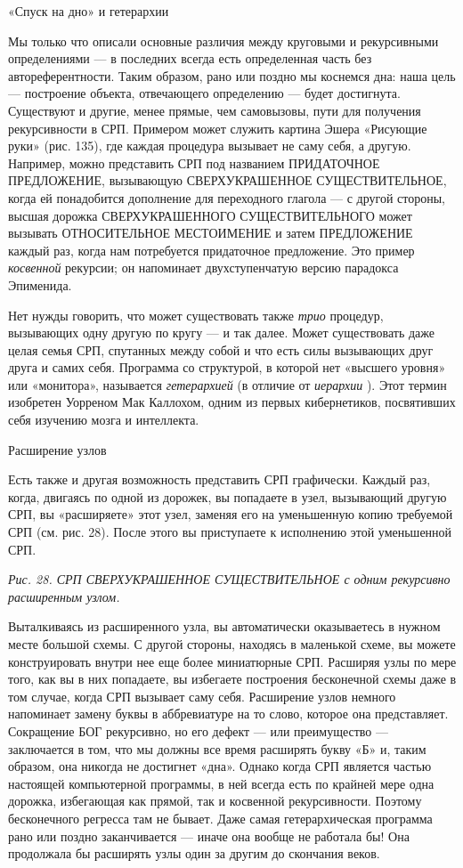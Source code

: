 «Спуск на дно» и гетерархии

Мы только что описали основные различия между круговыми и рекурсивными определениями --- в последних всегда есть определенная часть без автореферентности. Таким образом, рано или поздно мы коснемся дна: наша цель --- построение объекта, отвечающего определению --- будет достигнута. Существуют и другие, менее прямые, чем самовызовы, пути для получения рекурсивности в СРП. Примером может служить картина Эшера «Рисующие руки» (рис. 135), где каждая процедура вызывает не саму себя, а другую. Например, можно представить СРП под названием ПРИДАТОЧНОЕ ПРЕДЛОЖЕНИЕ, вызывающую СВЕРХУКРАШЕННОЕ СУЩЕСТВИТЕЛЬНОЕ, когда ей понадобится дополнение для переходного глагола --- с другой стороны, высшая дорожка СВЕРХУКРАШЕННОГО СУЩЕСТВИТЕЛЬНОГО может вызывать ОТНОСИТЕЛЬНОЕ МЕСТОИМЕНИЕ и затем ПРЕДЛОЖЕНИЕ каждый раз, когда нам потребуется придаточное предложение. Это пример \emph{косвенной} рекурсии; он напоминает двухступенчатую версию парадокса Эпименида.

Нет нужды говорить, что может существовать также \emph{трио} процедур, вызывающих одну другую по кругу --- и так далее. Может существовать даже целая семья СРП, спутанных между собой и что есть силы вызывающих друг друга и самих себя. Программа со структурой, в которой нет «высшего уровня» или «монитора», называется \emph{гетерархией} (в отличие от \emph{иерархии} ). Этот термин изобретен Уорреном Мак Каллохом, одним из первых кибернетиков, посвятивших себя изучению мозга и интеллекта.

Расширение узлов

Есть также и другая возможность представить СРП графически. Каждый раз, когда, двигаясь по одной из дорожек, вы попадаете в узел, вызывающий другую СРП, вы «расширяете» этот узел, заменяя его на уменьшенную копию требуемой СРП (см. рис. 28). После этого вы приступаете к исполнению этой уменьшенной СРП.

\emph{Рис. 28. СРП СВЕРХУКРАШЕННОЕ СУЩЕСТВИТЕЛЬНОЕ с одним рекурсивно расширенным узлом.}

Выталкиваясь из расширенного узла, вы автоматически оказываетесь в нужном месте большой схемы. С другой стороны, находясь в маленькой схеме, вы можете конструировать внутри нее еще более миниатюрные СРП. Расширяя узлы по мере того, как вы в них попадаете, вы избегаете построения бесконечной схемы даже в том случае, когда СРП вызывает саму себя. Расширение узлов немного напоминает замену буквы в аббревиатуре на то слово, которое она представляет. Сокращение БОГ рекурсивно, но его дефект --- или преимущество --- заключается в том, что мы должны все время расширять букву «Б» и, таким образом, она никогда не достигнет «дна». Однако когда СРП является частью настоящей компьютерной программы, в ней всегда есть по крайней мере одна дорожка, избегающая как прямой, так и косвенной рекурсивности. Поэтому бесконечного регресса там не бывает. Даже самая гетерархическая программа рано или поздно заканчивается --- иначе она вообще не работала бы! Она продолжала бы расширять узлы один за другим до скончания веков.

